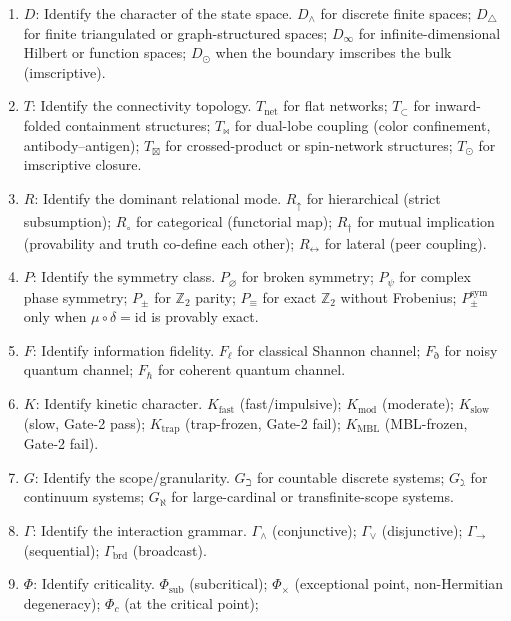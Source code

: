 \documentclass[12pt,a4paper]{article}
\newcommand{\Phic}{\Phi_c}
\newcommand{\Ppms}{P_{\pm}^{\text{sym}}}
\newcommand{\Tbw}{T_{\mathord{\bowtie}}}
\newcommand{\Tin}{T_{\mathord{\subset}}}
\newcommand{\Tbox}{T_{\mathord{\boxtimes}}}
\begin{document}
\begin{enumerate}[noitemsep]
  \item \textbf{$D$}: Identify the character of the state space.
    $D_\wedge$ for discrete finite spaces; $D_\triangle$ for finite
    triangulated or graph-structured spaces; $D_\infty$ for
    infinite-dimensional Hilbert or function spaces; $D_\odot$ when
    the boundary imscribes the bulk (imscriptive).
  \item \textbf{$T$}: Identify the connectivity topology.
    $T_\text{net}$ for flat networks; $\Tin$ for
    inward-folded containment structures; $\Tbw$ for dual-lobe
    coupling (color confinement, antibody--antigen); $\Tbox$ for
    crossed-product or spin-network structures; $T_\odot$ for
    imscriptive closure.
  \item \textbf{$R$}: Identify the dominant relational mode.
    $R_\uparrow$ for hierarchical (strict subsumption);
    $R_\circ$ for categorical (functorial map);
    $R_\dagger$ for mutual implication (provability and truth
    co-define each other); $R_\leftrightarrow$ for lateral
    (peer coupling).
  \item \textbf{$P$}: Identify the symmetry class.
    $P_\varnothing$ for broken symmetry; $P_\psi$ for complex phase
    symmetry; $P_\pm$ for $\mathbb{Z}_2$ parity; $P_\equiv$ for exact
    $\mathbb{Z}_2$ without Frobenius; $\Ppms$ only when
    $\mu \circ \delta = \text{id}$ is provably exact.
  \item \textbf{$F$}: Identify information fidelity.
    $F_\ell$ for classical Shannon channel; $F_\eth$ for noisy
    quantum channel; $F_\hbar$ for coherent quantum channel.
  \item \textbf{$K$}: Identify kinetic character.
    $K_\text{fast}$ (fast/impulsive); $K_\text{mod}$ (moderate);
    $K_\text{slow}$ (slow, Gate-2 pass); $K_\text{trap}$
    (trap-frozen, Gate-2 fail); $K_\text{MBL}$ (MBL-frozen, Gate-2 fail).
  \item \textbf{$G$}: Identify the scope/granularity.
    $G_\beth$ for countable discrete systems; $G_\gimel$ for
    continuum systems; $G_\aleph$ for large-cardinal or
    transfinite-scope systems.
  \item \textbf{$\Gamma$}: Identify the interaction grammar.
    $\Gamma_\wedge$ (conjunctive); $\Gamma_\vee$ (disjunctive);
    $\Gamma_{\to}$ (sequential); $\Gamma_\text{brd}$ (broadcast).
  \item \textbf{$\Phi$}: Identify criticality.
    $\Phi_\text{sub}$ (subcritical); $\Phi_\times$ (exceptional
    point, non-Hermitian degeneracy); $\Phic$ (at the critical point);

\end{enumerate}
\end{document}
